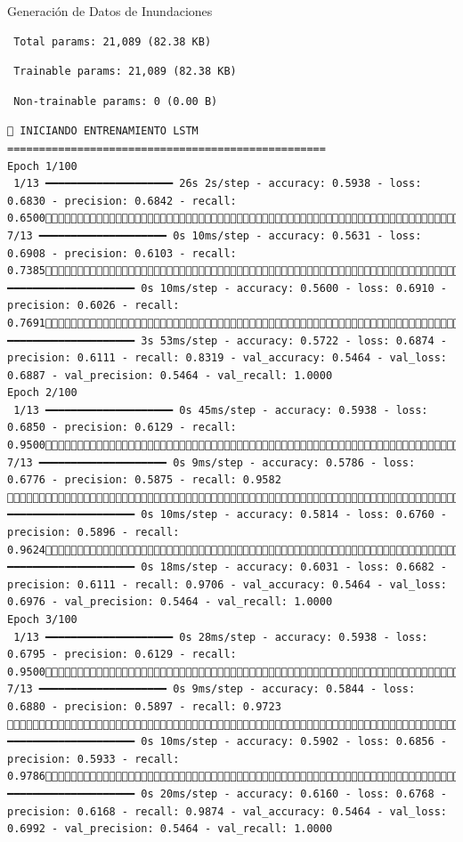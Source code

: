 \documentclass[
  ignorenonframetext,
]{beamer}
\begin{document}
\begin{frame}[fragile]{Generación de Datos de Inundaciones}
\begin{verbatim}
 Total params: 21,089 (82.38 KB)
\end{verbatim}

\begin{verbatim}
 Trainable params: 21,089 (82.38 KB)
\end{verbatim}

\begin{verbatim}
 Non-trainable params: 0 (0.00 B)
\end{verbatim}

\begin{verbatim}
🚀 INICIANDO ENTRENAMIENTO LSTM
==================================================
Epoch 1/100
 1/13 ━━━━━━━━━━━━━━━━━━━━ 26s 2s/step - accuracy: 0.5938 - loss: 0.6830 - precision: 0.6842 - recall: 0.6500 7/13 ━━━━━━━━━━━━━━━━━━━━ 0s 10ms/step - accuracy: 0.5631 - loss: 0.6908 - precision: 0.6103 - recall: 0.738512/13 ━━━━━━━━━━━━━━━━━━━━ 0s 10ms/step - accuracy: 0.5600 - loss: 0.6910 - precision: 0.6026 - recall: 0.769113/13 ━━━━━━━━━━━━━━━━━━━━ 3s 53ms/step - accuracy: 0.5722 - loss: 0.6874 - precision: 0.6111 - recall: 0.8319 - val_accuracy: 0.5464 - val_loss: 0.6887 - val_precision: 0.5464 - val_recall: 1.0000
Epoch 2/100
 1/13 ━━━━━━━━━━━━━━━━━━━━ 0s 45ms/step - accuracy: 0.5938 - loss: 0.6850 - precision: 0.6129 - recall: 0.9500 7/13 ━━━━━━━━━━━━━━━━━━━━ 0s 9ms/step - accuracy: 0.5786 - loss: 0.6776 - precision: 0.5875 - recall: 0.9582 12/13 ━━━━━━━━━━━━━━━━━━━━ 0s 10ms/step - accuracy: 0.5814 - loss: 0.6760 - precision: 0.5896 - recall: 0.962413/13 ━━━━━━━━━━━━━━━━━━━━ 0s 18ms/step - accuracy: 0.6031 - loss: 0.6682 - precision: 0.6111 - recall: 0.9706 - val_accuracy: 0.5464 - val_loss: 0.6976 - val_precision: 0.5464 - val_recall: 1.0000
Epoch 3/100
 1/13 ━━━━━━━━━━━━━━━━━━━━ 0s 28ms/step - accuracy: 0.5938 - loss: 0.6795 - precision: 0.6129 - recall: 0.9500 7/13 ━━━━━━━━━━━━━━━━━━━━ 0s 9ms/step - accuracy: 0.5844 - loss: 0.6880 - precision: 0.5897 - recall: 0.9723 12/13 ━━━━━━━━━━━━━━━━━━━━ 0s 10ms/step - accuracy: 0.5902 - loss: 0.6856 - precision: 0.5933 - recall: 0.978613/13 ━━━━━━━━━━━━━━━━━━━━ 0s 20ms/step - accuracy: 0.6160 - loss: 0.6768 - precision: 0.6168 - recall: 0.9874 - val_accuracy: 0.5464 - val_loss: 0.6992 - val_precision: 0.5464 - val_recall: 1.0000

\end{verbatim}
\end{frame}
\end{document}
